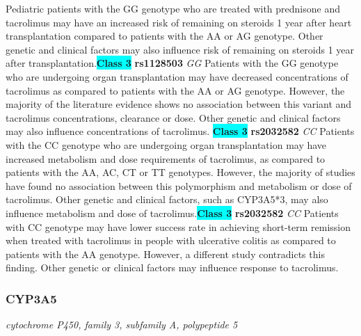\documentclass{report}
\begin{document}
Pediatric patients with the GG genotype who are treated with prednisone and tacrolimus may have an increased risk of remaining on steroids 1 year after heart transplantation compared to patients with the AA or AG genotype. Other genetic and clinical factors may also influence risk of remaining on steroids 1 year after transplantation.\newline\textbf{\colorbox{cyan} {Class 3}} \textbf{ rs1128503 } \textit{ GG }
Patients with the GG genotype who are undergoing organ transplantation may have decreased concentrations of tacrolimus as compared to patients with the AA or AG genotype. However, the majority of the literature evidence shows no association between this variant and tacrolimus concentrations, clearance or dose. Other genetic and clinical factors may also influence concentrations of tacrolimus. \newline\textbf{\colorbox{cyan} {Class 3}} \textbf{ rs2032582 } \textit{ CC }
Patients with the CC genotype who are undergoing organ transplantation may have increased metabolism and dose requirements of tacrolimus, as compared to patients with the AA, AC, CT or TT genotypes. However, the majority of studies have found no association between this polymorphism and metabolism or dose of tacrolimus. Other genetic and clinical factors, such as CYP3A5*3, may also influence metabolism and dose of tacrolimus.\newline\textbf{\colorbox{cyan} {Class 3}} \textbf{ rs2032582 } \textit{ CC }
Patients with CC genotype may have lower success rate in achieving short-term remission when treated with tacrolimus in people with ulcerative colitis as compared to patients with the AA genotype. However, a different study contradicts this finding. Other genetic or clinical factors may influence response to tacrolimus.\newline\subsubsection{ CYP3A5 }
\textit{ cytochrome P450, family 3, subfamily A, polypeptide 5 }
\end{document}
